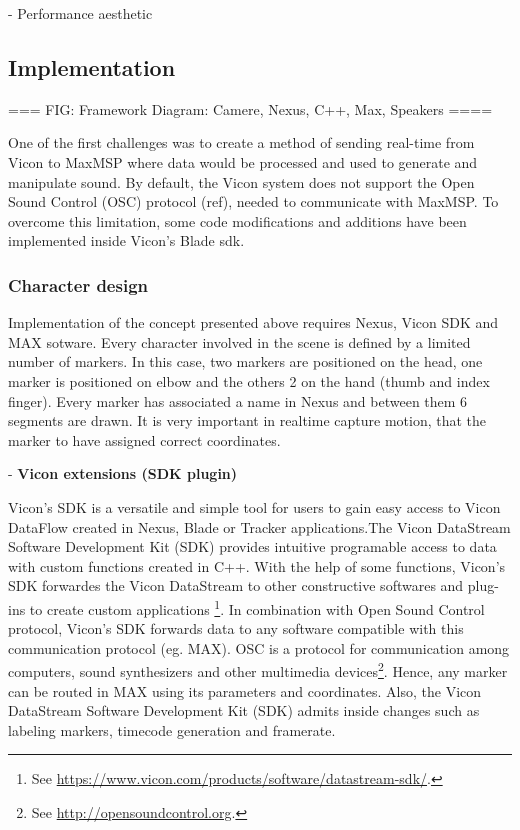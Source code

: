 \documentclass{nime-alternate}
\begin{document}
- Performance aesthetic\\

\subsection{Implementation}

=== FIG: Framework Diagram: Camere, Nexus, C++, Max, Speakers ====

One of the first challenges was to create a method of sending real-time from Vicon to MaxMSP where data would be processed and used to generate and manipulate sound. By default, the Vicon system does not support the Open Sound Control (OSC) protocol (ref), needed to communicate with MaxMSP. To overcome this limitation, some code modifications and additions have been implemented inside Vicon’s Blade sdk.


\subsubsection{Character design}

Implementation of the concept presented above requires Nexus, Vicon SDK and MAX sotware. Every character involved in the scene is defined by a limited number of markers. In this case, two markers are positioned on the head, one marker is positioned on elbow and the others 2 on the hand (thumb and index finger). Every marker has associated a name in Nexus and between them 6 segments are drawn. It is very important in realtime capture motion, that the marker to have assigned correct coordinates.

- \textbf{Vicon extensions (SDK plugin)} \par
Vicon's SDK is a versatile and simple tool for users to gain easy access to Vicon DataFlow created in Nexus, Blade or Tracker applications.The Vicon DataStream Software Development Kit (SDK) provides intuitive programable access to data with custom functions created in C++. With the help of some functions, Vicon's SDK forwardes the Vicon DataStream to other constructive softwares and plug-ins to create custom applications \footnote{See \url{https://www.vicon.com/products/software/datastream-sdk/}.}. In combination with Open Sound Control protocol, Vicon's SDK forwards data to any software compatible with this communication protocol (eg. MAX). OSC is a protocol for communication among computers, sound synthesizers and other multimedia devices\footnote{See  \url{http://opensoundcontrol.org}.}. Hence, any marker can be routed in MAX using its parameters and coordinates. Also, the Vicon DataStream Software Development Kit (SDK) admits inside changes such as labeling markers, timecode generation and framerate.
\end{document}
